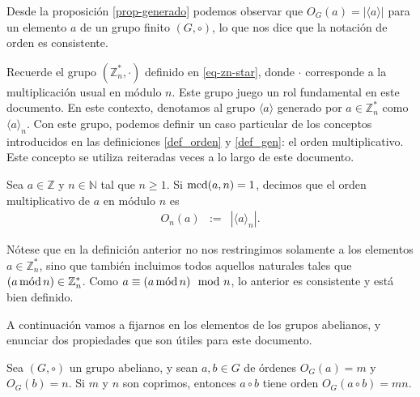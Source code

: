 Desde la proposición \ref{prop-generado} podemos observar que $O_G(a)
= |\langle a\rangle |$ para un elemento $a$ de un grupo finito
$(G,\circ)$, lo que nos dice que la notación de orden es consistente.

Recuerde el grupo $(\mathbb{Z}_n^*,\cdot)$ definido en \ref{eq-zn-star}, donde $\cdot$ corresponde a la
multiplicación usual en módulo $n$. Este grupo juego un rol fundamental en este documento. 
En este contexto, denotamos al grupo $\langle a \rangle$ generado por
$a\in \mathbb{Z}_n^*$ como $\langle a\rangle_n$.
Con este grupo, podemos definir un caso particular de los conceptos
introducidos en las definiciones \ref{def_orden} y \ref{def_gen}: el
orden multiplicativo. Este concepto se utiliza reiteradas veces a lo
largo de este documento.


\begin{definition}\label{def_ord_mult}
	 Sea $a\in \mathbb{Z}$ y $n\in \mathbb{N}$ tal que $n \geq 1$. Si $\MCD(a,n)=1$, decimos que el orden multiplicativo de $a$ en módulo $n$ es
         \begin{eqnarray*}
         O_n(a) & := & |\langle a\rangle _n|.
         \end{eqnarray*}
\end{definition}
Nótese que en la definición anterior no nos restringimos solamente a
los elementos $a\in\mathbb{Z}_n^*$, sino que también incluimos todos
aquellos naturales tales que $(a \mods n) \in \mathbb{Z}_n^*$. Como $a \equiv (a\mods n) \modl n$, lo anterior es consistente y está bien
definido.

A continuación vamos a fijarnos en los elementos de los grupos abelianos, y enunciar dos propiedades que son útiles para este documento.
\begin{theorem}\label{orden del producto coprimos}
	Sea $(G,\circ)$ un grupo abeliano, y sean $a,b\in G$ de órdenes $O_G(a)=m$ y $O_G(b)=n$. Si $m$ y $n$ son coprimos, entonces $a\circ b$ tiene orden $O_G(a\circ b)=mn$.
\end{theorem}

